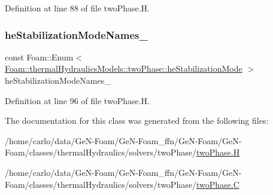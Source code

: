 Definition at line 88 of file two\+Phase.\+H.

\mbox{\label{classFoam_1_1thermalHydraulicsModels_1_1twoPhase_af02a4f231a65729467fc0f13e2ffe155}} 
\subsubsection{\texorpdfstring{he\+Stabilization\+Mode\+Names\+\_\+}{heStabilizationModeNames\_}}
{\footnotesize\ttfamily const Foam\+::\+Enum$<$ \hyperlink{classFoam_1_1thermalHydraulicsModels_1_1twoPhase_a267c0cac9152d0c90cbba342a131a26e}{Foam\+::thermal\+Hydraulics\+Models\+::two\+Phase\+::he\+Stabilization\+Mode} $>$ he\+Stabilization\+Mode\+Names\+\_\+\hspace{0.3cm}{\ttfamily [static]}}



Definition at line 96 of file two\+Phase.\+H.



The documentation for this class was generated from the following files\+:\begin{DoxyCompactItemize}
\item 
/home/carlo/data/\+Ge\+N-\/\+Foam/\+Ge\+N-\/\+Foam\+\_\+ffn/\+Ge\+N-\/\+Foam/\+Ge\+N-\/\+Foam/classes/thermal\+Hydraulics/solvers/two\+Phase/\hyperlink{twoPhase_8H}{two\+Phase.\+H}\item 
/home/carlo/data/\+Ge\+N-\/\+Foam/\+Ge\+N-\/\+Foam\+\_\+ffn/\+Ge\+N-\/\+Foam/\+Ge\+N-\/\+Foam/classes/thermal\+Hydraulics/solvers/two\+Phase/\hyperlink{twoPhase_8C}{two\+Phase.\+C}\end{DoxyCompactItemize}
